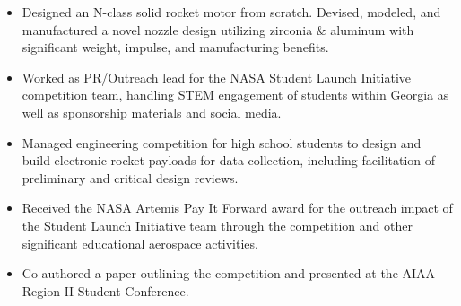 \begin{tcolorbox}
\begin{minipage}[t]{0.825\textwidth}
\begin{tcolorbox}[grow to right by=0.95cm,height=0.85\textheight,colframe=white,colback=white]
{                        \begin{itemize}

                            \item Designed an N-class solid rocket motor from scratch. Devised, modeled, and manufactured a novel nozzle design utilizing zirconia \& aluminum with significant weight, impulse, and manufacturing benefits.

                            \item Worked as PR/Outreach lead for the NASA Student Launch Initiative competition team, handling STEM engagement of students within Georgia as well as sponsorship materials and social media.

                            \item Managed engineering competition for high school students to design and build electronic rocket payloads for data collection, including facilitation of preliminary and critical design reviews.

                            \item Received the NASA Artemis Pay It Forward award for the outreach impact of the Student Launch Initiative team through the competition and other significant educational aerospace activities.

                            \item Co-authored a paper outlining the competition and presented at the AIAA Region II Student Conference.
                            
                        \end{itemize}}

                    \vspace{1em}
                    
\end{tcolorbox}
\end{minipage}
\end{tcolorbox}
